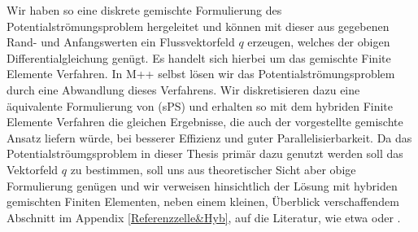 Wir haben so eine diskrete gemischte Formulierung des Potentialströmungsproblem hergeleitet und können mit dieser aus gegebenen Rand- und Anfangswerten ein Flussvektorfeld $q$ erzeugen, welches der obigen Differentialgleichung genügt.
Es handelt sich hierbei um das gemischte Finite Elemente Verfahren. In M++ selbst lösen wir das Potentialströmungsproblem durch eine Abwandlung dieses Verfahrens. Wir diskretisieren dazu eine äquivalente Formulierung von (sPS) und erhalten so mit dem hybriden Finite Elemente Verfahren die gleichen Ergebnisse, die auch der vorgestellte gemischte Ansatz liefern würde, bei besserer Effizienz und guter Parallelisierbarkeit. Da das Potentialströumgsproblem in dieser Thesis primär dazu genutzt werden soll das Vektorfeld $q$ zu bestimmen, soll uns aus theoretischer Sicht aber obige Formulierung genügen und wir verweisen hinsichtlich der Lösung mit hybriden gemischten Finiten Elementen, neben einem kleinen, Überblick verschaffendem Abschnitt im Appendix \ref{Referenzzelle&Hyb}, auf die Literatur, wie etwa \cite{brezzi2012mixed} oder  \cite{roberts1991mixed}.











